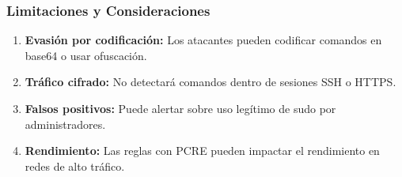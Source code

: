 {\subsubsection{Limitaciones y Consideraciones}

\begin{enumerate}
    \item \textbf{Evasión por codificación:} Los atacantes pueden codificar comandos en base64 o usar ofuscación.
    \item \textbf{Tráfico cifrado:} No detectará comandos dentro de sesiones SSH o HTTPS.
    \item \textbf{Falsos positivos:} Puede alertar sobre uso legítimo de sudo por administradores.
    \item \textbf{Rendimiento:} Las reglas con PCRE pueden impactar el rendimiento en redes de alto tráfico.
\end{enumerate}









}
